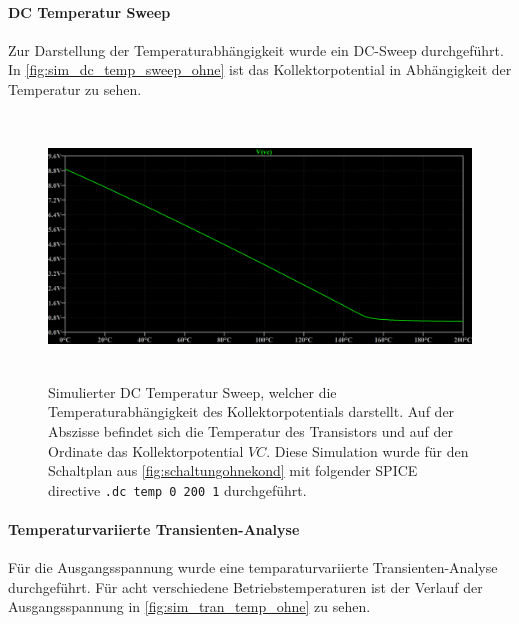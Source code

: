 \documentclass[12pt,english,ngerman]{scrartcl}
\begin{document}
\paragraph{DC Temperatur Sweep}
Zur Darstellung der Temperaturabhängigkeit wurde ein DC-Sweep durchgeführt. In \autoref{fig:sim_dc_temp_sweep_ohne} ist das Kollektorpotential in Abhängigkeit der Temperatur zu sehen.
\begin{figure}[H]
  \centering
    \includegraphics[width=\linewidth, height=7cm]{./figures/ohnekond/tempsweepdclinear.png }
    \caption[Simulierter DC Temperatur Sweep ohne
    Überbrückungskondensator]{Simulierter DC Temperatur Sweep, welcher die
      Temperaturabhängigkeit des Kollektorpotentials darstellt. Auf der
      Abszisse befindet sich die Temperatur des Transistors und auf der Ordinate
      das Kollektorpotential $VC$. Diese Simulation wurde für den
      Schaltplan aus \autoref{fig:schaltungohnekond} mit folgender SPICE
      directive \texttt{.dc temp 0 200 1} durchgeführt.
  }
  \label{fig:sim_dc_temp_sweep_ohne}
\end{figure}


\paragraph{Temperaturvariierte Transienten-Analyse}
Für die Ausgangsspannung wurde eine temparaturvariierte Transienten-Analyse durchgeführt. Für acht verschiedene Betriebstemperaturen ist der Verlauf der Ausgangsspannung in \autoref{fig:sim_tran_temp_ohne} zu sehen.
\end{document}
